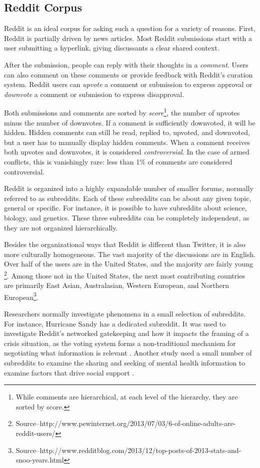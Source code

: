 \subsection{Reddit Corpus}
Reddit is an ideal corpus for asking such a question for a variety of reasons. First, Reddit is partially driven by news articles. Most Reddit submissions start with a user submitting a hyperlink, giving discussants a clear shared context.

After the submission, people can reply with their thoughts in a \textit{comment}. Users can also comment on these comments or provide feedback with Reddit's curation system. Reddit users can \textit{upvote} a comment or submission to express approval or \textit{downvote} a comment or submission to express disapproval.

Both submissions and comments are sorted by \textit{score}\footnote{While comments are hierarchical, at each level of the hierarchy, they are sorted by score.}, the number of upvotes minus the number of downvotes. If a comment is sufficiently downvoted, it will be hidden. Hidden comments can still be read, replied to, upvoted, and downvoted, but a user has to manually display hidden comments. When a comment receives both upvotes and downvotes, it is considered \textit{controversial}. In the case of armed conflicts, this is vanishingly rare: less than 1\% of comments are considered controversial.  

Reddit is organized into a highly expandable number of smaller forums, normally referred to as subreddits. Each of these subreddits can be about any given topic, general or specific. For instance, it is possible to have subreddits about science, biology, and genetics. These three subreddits can be completely independent, as they are not organized hierarchically.

Besides the organizational ways that Reddit is different than Twitter, it is also more culturally homogeneous. The vast majority of the discussions are in English. Over half of the users are in the United States, and the majority are fairly young \footnote{Source--http://www.pewinternet.org/2013/07/03/6-of-online-adults-are-reddit-users/}. Among those not in the United States, the next most contributing countries are primarily East Asian, Australasian, Western European, and Northern European\footnote{Source--http://www.redditblog.com/2013/12/top-posts-of-2013-stats-and-snoo-years.html}. 

Researchers normally investigate phenomena in a small selection of subreddits. For instance, Hurricane Sandy has a dedicated subreddit. It was used to investigate Reddit's networked gatekeeping and how it impacts the framing of a crisis situation, as the voting system forms a non-traditional mechanism for negotiating what information is relevant \cite{Leavitt}. Another study used a small number of subreddits to examine the sharing and seeking of mental health information to examine factors that drive social support \cite{dechoudhury2014mental}.

